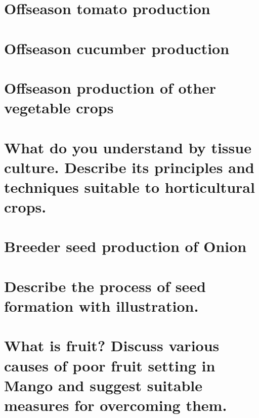 \documentclass[
]{book}
\begin{document}
\hypertarget{offseason-tomato-production}{%
\section{Offseason tomato production}\label{offseason-tomato-production}}

\hypertarget{offseason-cucumber-production}{%
\section{Offseason cucumber production}\label{offseason-cucumber-production}}

\hypertarget{offseason-production-of-other-vegetable-crops}{%
\section{Offseason production of other vegetable crops}\label{offseason-production-of-other-vegetable-crops}}

\hypertarget{what-do-you-understand-by-tissue-culture.-describe-its-principles-and-techniques-suitable-to-horticultural-crops.}{%
\section{What do you understand by tissue culture. Describe its principles and techniques suitable to horticultural crops.}\label{what-do-you-understand-by-tissue-culture.-describe-its-principles-and-techniques-suitable-to-horticultural-crops.}}

\hypertarget{breeder-seed-production-of-onion}{%
\section{Breeder seed production of Onion}\label{breeder-seed-production-of-onion}}

\hypertarget{describe-the-process-of-seed-formation-with-illustration.}{%
\section{Describe the process of seed formation with illustration.}\label{describe-the-process-of-seed-formation-with-illustration.}}

\hypertarget{what-is-fruit-discuss-various-causes-of-poor-fruit-setting-in-mango-and-suggest-suitable-measures-for-overcoming-them.}{%
\section{What is fruit? Discuss various causes of poor fruit setting in Mango and suggest suitable measures for overcoming them.}\label{what-is-fruit-discuss-various-causes-of-poor-fruit-setting-in-mango-and-suggest-suitable-measures-for-overcoming-them.}}
\end{document}
